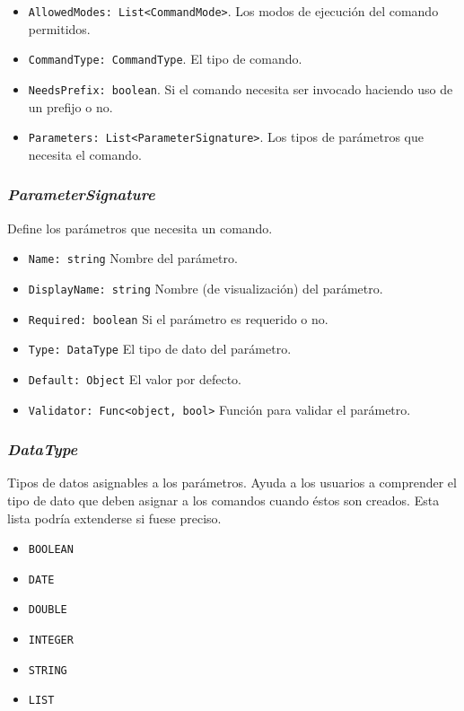 \begin{itemize}
	\item \verb|AllowedModes: List<CommandMode>|. Los modos de ejecución del comando permitidos.
	\item \verb|CommandType: CommandType|. El tipo de comando.
	\item \verb|NeedsPrefix: boolean|. Si el comando necesita ser invocado haciendo uso de un prefijo o no.
	\item \verb|Parameters: List<ParameterSignature>|. Los tipos de parámetros que necesita el comando.
\end{itemize}


\subsubsection{\textit{ParameterSignature}}

Define los parámetros que necesita un comando.

\begin{itemize}
	\item \verb|Name: string| Nombre del parámetro.
	\item \verb|DisplayName: string| Nombre (de visualización) del parámetro.
	\item \verb|Required: boolean| Si el parámetro es requerido o no.
	\item \verb|Type: DataType| El tipo de dato del parámetro.
	\item \verb|Default: Object| El valor por defecto.
	\item \verb|Validator: Func<object, bool>| Función para validar el parámetro.
\end{itemize}


\subsubsection{\textit{DataType}}

Tipos de datos asignables a los parámetros. Ayuda a los usuarios a comprender el tipo de dato que deben asignar a los comandos cuando éstos son creados. Esta lista podría extenderse si fuese preciso.

\begin{itemize}
	\item \verb|BOOLEAN|
	\item \verb|DATE|
	\item \verb|DOUBLE|
	\item \verb|INTEGER|
	\item \verb|STRING|
	\item \verb|LIST|
\end{itemize}


